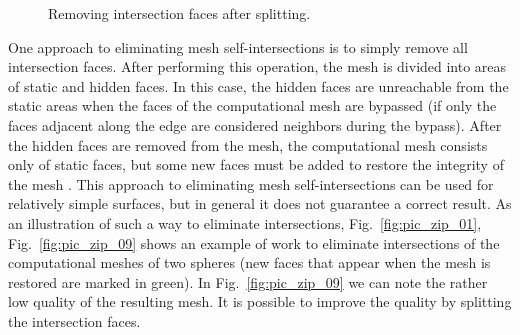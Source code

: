 \documentclass[
11pt,%
tightenlines,%
twoside,%
onecolumn,%
nofloats,%
nobibnotes,%
nofootinbib,%
superscriptaddress,%
noshowpacs,%
centertags]%
{revtex4-2}
\begin{document}
\begin{figure}[h]
\begin{minipage}[h]{0.3\textwidth}
    \caption{Removing intersection faces after splitting.}\label{fig:pic_zip_15}
  \end{minipage}
\end{figure}

One approach to eliminating mesh self-intersections is to simply remove all intersection faces.
After performing this operation, the mesh is divided into areas of static and hidden faces.
In this case, the hidden faces are unreachable from the static areas when the faces of the computational mesh are bypassed (if only the faces adjacent along the edge are considered neighbors during the bypass).
After the hidden faces are removed from the mesh, the computational mesh consists only of static faces, but some new faces must be added to restore the integrity of the mesh \cite{Charton}.
This approach to eliminating mesh self-intersections can be used for relatively simple surfaces, but in general it does not guarantee a correct result.
As an illustration of such a way to eliminate intersections, Fig.~\ref{fig:pic_zip_01}, Fig.~\ref{fig:pic_zip_09} shows an example of work to eliminate intersections of the computational meshes of two spheres (new faces that appear when the mesh is restored are marked in green).
In Fig.~\ref{fig:pic_zip_09} we can note the rather low quality of the resulting mesh.
It is possible to improve the quality by splitting the intersection faces.
\end{document}
